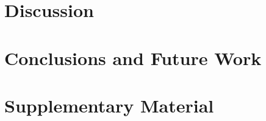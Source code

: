 \documentclass[english, a4paper, 12pt, twoside, openany]{book}
\begin{document}
\chapter{Discussion}\label{chap:discussion}
    
\clearpage

\chapter{Conclusions and Future Work}\label{chap:conclusions}
    
\clearpage

\newpage
\renewcommand\refname{References}          %
{                           %
}

\newpage
\renewcommand{\appendixpagename}{Appendices}     %

\appendix   %

\chapter{Supplementary Material}\label{chap:appendices}                      %
\clearpage
\end{document}
